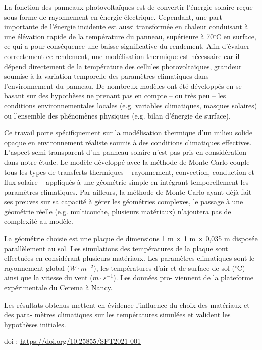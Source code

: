 {\normalsize
La fonction des panneaux photovoltaïques est de convertir l'énergie solaire reçue sous forme de rayonnement en énergie électrique. Cependant, une part importante de l'énergie incidente est aussi transformée en chaleur conduisant à une élévation rapide de la température du panneau, supérieure à 70$^{\circ}$C en surface, ce qui a pour conséquence une baisse significative du rendement. Afin d'évaluer correctement ce rendement, une modélisation thermique est nécessaire car il dépend directement de la température des cellules photovoltaïques, grandeur soumise à la variation temporelle des paramètres climatiques dans l'environnement du panneau. De nombreux modèles ont été développés en se basant sur des hypothèses ne prenant pas en compte – ou très peu – les conditions environnementales locales (e.g. variables climatiques, masques solaires) ou l'ensemble des phénomènes physiques (e.g. bilan d'énergie de surface).







Ce travail porte spécifiquement sur la modélisation thermique d'un milieu solide opaque en environnement réaliste soumis à des conditions climatiques effectives. L'aspect semi-transparent d'un panneau solaire n'est pas pris en considération dans notre étude. Le modèle développé avec la méthode de Monte Carlo couple tous les types de transferts thermiques – rayonnement, convection, conduction et flux solaire – appliqués à une géométrie simple en intégrant temporellement les paramètres climatiques. Par ailleurs, la méthode de Monte Carlo ayant déjà fait ses preuves sur sa capacité à gérer les géométries complexes, le passage à une géométrie réelle (e.g. multicouche, plusieurs matériaux) n'ajoutera pas de complexité au modèle.







La géométrie choisie est une plaque de dimensions 1 m × 1 m × 0,035 m disposée parallèlement au sol. Les simulations des températures de la plaque sont effectuées en considérant plusieurs matériaux. Les paramètres climatiques sont le rayonnement global ($\unit{W\cdot m^{-2}}$), les températures d'air et de surface de sol ($^{\circ}$C) ainsi que la vitesse du vent ($\unit{m \cdot s^{-1}}$). Les données pro- viennent de la plateforme expérimentale du Cerema à Nancy.







Les résultats obtenus mettent en évidence l'influence du choix des matériaux et des para- mètres climatiques sur les températures simulées et valident les hypothèses initiales.

 \vfill doi : \url{https://doi.org/10.25855/SFT2021-001}

}
 
